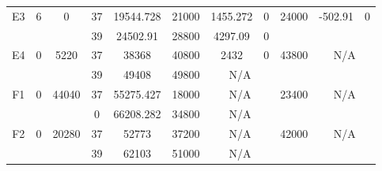 \begin{sidewaystable}
\begin{tabular}{c||c|c||c|c|c|c|c||c|c|c}
         &
        
      \\
      \hline
      \multirow{2}{*}{E3} &
      \multirow{2}{*}{6} &
      \multirow{2}{*}{0} &
      37 &
      19544.728 &
      21000 &
        1455.272 &
        0 &
      \multirow{2}{*}{24000} &
        \multirow{2}{*}{-502.91} &
        \multirow{2}{*}{0}
      \\
      \cline{4-8}
       &
       &
       &
      39 &
      24502.91 &
      28800 &
        4297.09 &
        0 &
      
         &
        
      \\
      \hline
      \multirow{2}{*}{E4} &
      \multirow{2}{*}{0} &
      \multirow{2}{*}{5220} &
      37 &
      38368 &
      40800 &
        2432 &
        0 &
      \multirow{2}{*}{43800} &
        \multicolumn{2}{c}{\multirow{2}{*}{N/A}}
      \\
      \cline{4-8}
       &
       &
       &
      39 &
      49408 &
      49800 &
        \multicolumn{2}{|c||}{N/A} &
      
        
      \\
      \hline
      \multirow{2}{*}{F1} &
      \multirow{2}{*}{0} &
      \multirow{2}{*}{44040} &
      37 &
      55275.427 &
      18000 &
        \multicolumn{2}{|c||}{N/A} &
      \multirow{2}{*}{23400} &
        \multicolumn{2}{c}{\multirow{2}{*}{N/A}}
      \\
      \cline{4-8}
       &
       &
       &
      0 &
      66208.282 &
      34800 &
        \multicolumn{2}{|c||}{N/A} &
      
        
      \\
      \hline
      \multirow{2}{*}{F2} &
      \multirow{2}{*}{0} &
      \multirow{2}{*}{20280} &
      37 &
      52773 &
      37200 &
        \multicolumn{2}{|c||}{N/A} &
      \multirow{2}{*}{42000} &
        \multicolumn{2}{c}{\multirow{2}{*}{N/A}}
      \\
      \cline{4-8}
       &
       &
       &
      39 &
      62103 &
      51000 &
        \multicolumn{2}{|c||}{N/A} &
      
        
      \\
\end{tabular}
\label{table:RDS3.txt-11697.tex} 
\end{sidewaystable}